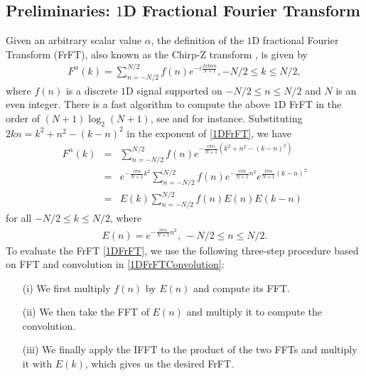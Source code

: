 \documentclass{UCF_ETD}
\begin{document}
 \subsection{Preliminaries: $1$D Fractional Fourier Transform}
  Given an arbitrary scalar value $\alpha$, the definition of the $1$D fractional Fourier Transform (FrFT), also known as the Chirp-Z transform \cite{Bailey1991}, is given by
 \begin{eqnarray} \label{1DFrFT}
 F^{\alpha}(k) = \sum\limits_{n=-N/2}^{N/2} f(n) e^{-i\frac{2\pi k\alpha n}{N+1}} , -N/2 \leq k \leq N/2,
 \end{eqnarray}
 where $f(n)$ is a discrete $1$D signal supported on  $-N/2 \leq  n \leq N/2$ and
  $N$ is an even integer.  There is a fast algorithm to compute the above $1$D FrFT in the order of $(N+1)\log_2(N+1)$, see  \cite{Bailey1991} and \cite{Amir2006} for instance.
 Substituting $2kn = k^2 + n^2 - (k-n)^2$ in the exponent of \eqref{1DFrFT}, we have
 \begin{eqnarray} \label{1DFrFTConvolution}
 F^{\alpha}(k) & = & \sum\limits_{n=-N/2}^{N/2} f(n) e^{-\frac{i\pi \alpha}{N+1} (k^2+n^2-(k-n)^2)}\nonumber \\
 &= & e^{-\frac{i\pi \alpha}{N+1} k^2} \sum\limits_{n=-N/2}^{N/2} f(n) e^{-\frac{i\pi \alpha}{N+1}n^2} e^{\frac{i\pi \alpha}{N+1}(k-n)^2}\nonumber\\
 & = & E(k)  \sum\limits_{n=-N/2}^{N/2} f(n) E(n)E(k-n) %
 \end{eqnarray}
 for all  $-N/2 \leq k \leq N/2$, where
 \begin{eqnarray}
 E(n) =e^{-\frac{i\pi \alpha}{N+1}n^2},\  -N/2 \leq n \leq N/2.
 \end{eqnarray}
 To evaluate the FrFT \eqref{1DFrFT}, we use the following three-step procedure based on
   FFT and convolution in \eqref{1DFrFTConvolution}:
  \begin{itemize}
  \item[{(i)}] We first multiply $f(n)$ by $E(n)$ and compute its FFT.
  \item[{(ii)}] We then take the FFT of $E(n)$ and multiply it to compute the convolution.
  \item[{(iii)}] We finally apply the IFFT to the product of the two FFTs and  multiply it with $E(k)$, which gives us the desired FrFT.
 \end{itemize}
 
\end{document}
